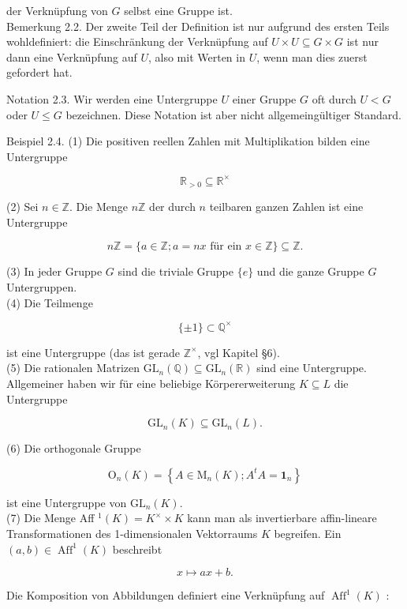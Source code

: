 \documentclass[10pt, letterpaper]{article}
\begin{document}
der Verknüpfung von $G$ selbst eine Gruppe ist.\\
Bemerkung 2.2. Der zweite Teil der Definition ist nur aufgrund des ersten Teils wohldefiniert: die Einschränkung der Verknüpfung auf $U \times U \subseteq G \times G$ ist nur dann eine Verknüpfung auf $U$, also mit Werten in $U$, wenn man dies zuerst gefordert hat.

Notation 2.3. Wir werden eine Untergruppe $U$ einer Gruppe $G$ oft durch $U<G$ oder $U \leq G$ bezeichnen. Diese Notation ist aber nicht allgemeingültiger Standard.

Beispiel 2.4. (1) Die positiven reellen Zahlen mit Multiplikation bilden eine Untergruppe

$$
\mathbb{R}_{>0} \subseteq \mathbb{R}^{\times}
$$

(2) Sei $n \in \mathbb{Z}$. Die Menge $n \mathbb{Z}$ der durch $n$ teilbaren ganzen Zahlen ist eine Untergruppe

$$
n \mathbb{Z}=\{a \in \mathbb{Z} ; a=n x \text { für ein } x \in \mathbb{Z}\} \subseteq \mathbb{Z} .
$$

(3) In jeder Gruppe $G$ sind die triviale Gruppe $\{e\}$ und die ganze Gruppe $G$ Untergruppen.\\
(4) Die Teilmenge

$$
\{ \pm 1\} \subset \mathbb{Q}^{\times}
$$

ist eine Untergruppe (das ist gerade $\mathbb{Z}^{\times}$, vgl Kapitel §6).\\
(5) Die rationalen Matrizen $\mathrm{GL}_{n}(\mathbb{Q}) \subseteq \mathrm{GL}_{n}(\mathbb{R})$ sind eine Untergruppe. Allgemeiner haben wir für eine beliebige Körpererweiterung $K \subseteq L$ die Untergruppe

$$
\mathrm{GL}_{n}(K) \subseteq \mathrm{GL}_{n}(L) .
$$

(6) Die orthogonale Gruppe

$$
\mathrm{O}_{n}(K)=\left\{A \in \mathrm{M}_{n}(K) ; A^{t} A=\mathbf{1}_{n}\right\}
$$

ist eine Untergruppe von $\mathrm{GL}_{n}(K)$.\\
(7) Die Menge Aff ${ }^{1}(K)=K^{\times} \times K$ kann man als invertierbare affin-lineare Transformationen des 1-dimensionalen Vektorraums $K$ begreifen. Ein $(a, b) \in \operatorname{Aff}^{1}(K)$ beschreibt

$$
x \mapsto a x+b .
$$

Die Komposition von Abbildungen definiert eine Verknüpfung auf $\operatorname{Aff}^{1}(K)$ :
\end{document}
